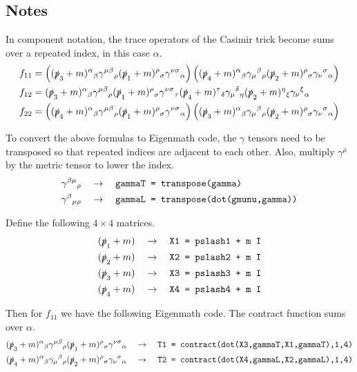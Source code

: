 \documentclass[12pt]{article}
\begin{document}
\subsection*{Notes}
In component notation, the trace operators of the Casimir trick become sums over
a repeated index, in this case $\alpha$.
\begin{align*}
f_{11}&=
\left(
(\slashed{p}_3+m)^\alpha{}_\beta
\gamma^{\mu\beta}{}_\rho
(\slashed{p}_1+m)^\rho{}_\sigma
\gamma^{\nu\sigma}{}_\alpha
\right)
\left(
(\slashed{p}_4+m)^\alpha{}_\beta
\gamma_\mu{}^\beta{}_\rho
(\slashed{p}_2+m)^\rho{}_\sigma
\gamma_\nu{}^\sigma{}_\alpha
\right)
\\
f_{12}&=
(\slashed{p}_3+m)^\alpha{}_\beta
\gamma^{\mu\beta}{}_\rho
(\slashed{p}_1+m)^\rho{}_\sigma
\gamma^{\nu\sigma}{}_\tau
(\slashed{p}_4+m)^\tau{}_\delta
\gamma_\mu{}^\delta{}_\eta
(\slashed{p}_2+m)^\eta{}_\xi
\gamma_\nu{}^\xi{}_\alpha
\\
f_{22}&=
\left(
(\slashed{p}_4+m)^\alpha{}_\beta
\gamma^{\mu\beta}{}_\rho
(\slashed{p}_1+m)^\rho{}_\sigma
\gamma^{\nu\sigma}{}_\alpha
\right)
\left(
(\slashed{p}_3+m)^\alpha{}_\beta
\gamma_\mu{}^\beta{}_\rho
(\slashed{p}_2+m)^\rho{}_\sigma
\gamma_\nu{}^\sigma{}_\alpha
\right)
\end{align*}

\noindent
To convert the above formulas to Eigenmath code,
the $\gamma$ tensors need to be transposed
so that repeated indices are adjacent to each other.
Also, multiply $\gamma^\mu$ by the metric tensor to lower the index.
\begin{align*}
\gamma^{\beta\mu}{}_\rho\quad&\rightarrow\quad
\text{\tt gammaT = transpose(gamma)}\\
\gamma^\beta{}_{\mu\rho}\quad&\rightarrow\quad
\text{\tt gammaL = transpose(dot(gmunu,gamma))}
\end{align*}

\noindent
Define the following $4\times4$ matrices.
\begin{align*}
(\slashed{p}_1+m)\quad&\rightarrow\quad\text{\tt X1 = pslash1 + m I}\\
(\slashed{p}_2+m)\quad&\rightarrow\quad\text{\tt X2 = pslash2 + m I}\\
(\slashed{p}_3+m)\quad&\rightarrow\quad\text{\tt X3 = pslash3 + m I}\\
(\slashed{p}_4+m)\quad&\rightarrow\quad\text{\tt X4 = pslash4 + m I}
\end{align*}

\noindent
Then for $f_{11}$ we have the following Eigenmath code.
The contract function sums over $\alpha$.
\begin{align*}
(\slashed{p}_3+m)^\alpha{}_\beta
\gamma^{\mu\beta}{}_\rho
(\slashed{p}_1+m)^\rho{}_\sigma
\gamma^{\nu\sigma}{}_\alpha
\quad&\rightarrow\quad
\text{\tt T1 = contract(dot(X3,gammaT,X1,gammaT),1,4)}
\\
(\slashed{p}_4+m)^\alpha{}_\beta
\gamma_\mu{}^\beta{}_\rho
(\slashed{p}_2+m)^\rho{}_\sigma
\gamma_\nu{}^\sigma{}_\alpha
\quad&\rightarrow\quad
\text{\tt T2 = contract(dot(X4,gammaL,X2,gammaL),1,4)}
\end{align*}
\end{document}
